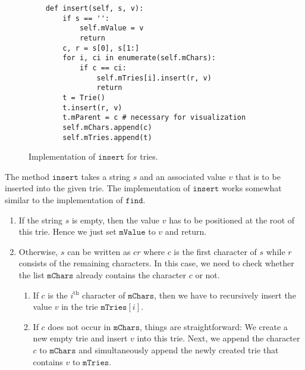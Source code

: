 \begin{figure}[!ht]
\centering
\begin{verbatim}
    def insert(self, s, v):
        if s == '':
            self.mValue = v
            return
        c, r = s[0], s[1:]
        for i, ci in enumerate(self.mChars):
            if c == ci:
                self.mTries[i].insert(r, v)
                return
        t = Trie()
        t.insert(r, v)
        t.mParent = c # necessary for visualization
        self.mChars.append(c)
        self.mTries.append(t)
\end{verbatim}
\vspace*{-0.3cm}
\caption{Implementation of $\texttt{insert}$ for tries.}
\label{fig:trie.ipython-insert}
\end{figure}


The method $\texttt{insert}$ takes a string $s$ and an associated value $v$ that is to be inserted
into the given trie.  The implementation of $\texttt{insert}$ works somewhat similar to the
implementation of $\texttt{find}$.
\begin{enumerate}
\item If the string $s$ is empty, then the value $v$ has to be positioned at the root of this trie.
      Hence we just set $\texttt{mValue}$ to $v$ and return.
\item Otherwise, $s$ can be written as $cr$ where $c$ is the first character of $s$ while $r$
      consists of the remaining characters.  In this case, we need to check whether the list
      $\texttt{mChars}$ already contains the character $c$ or not.
      \begin{enumerate}
      \item If $c$ is the $i^\textrm{th}$ character of $\texttt{mChars}$, then we have to recursively insert the value $v$
            in the trie $\texttt{mTries}[i]$.  
      \item If $c$ does not occur in $\texttt{mChars}$, things are straightforward: We create a new
            empty trie and insert $v$ into this trie.  Next, we append the character $c$ to
            $\texttt{mChars}$ and simultaneously append the newly created trie that contains $v$ to
            $\texttt{mTries}$. 
      \end{enumerate}
\end{enumerate}

